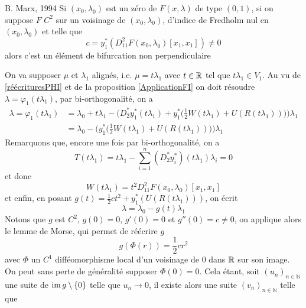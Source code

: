 \documentclass[memoire.tex]{subfiles}
\begin{document}
\begin{theobox}{B. Marx, 1994}{}
    Si $(x_0,\lambda_0)$ est un zéro de $F(x,\lambda)$ de type $(0,1)$, si on suppose $F$ $C^2$ sur un voisinage de $(x_0,\lambda_0)$, d'indice de Fredholm nul en $(x_0,\lambda_0)$ et telle que
    \begin{equation*}
        c=y_1^{*}\left(D^2_{11}F(x_0,\lambda_0)[x_1,x_1]\right)\neq 0
    \end{equation*}
    alors c'est un élément de bifurcation non perpendiculaire
\end{theobox}
\begin{preuve}
    On va supposer $\mu$ et $\lambda_1$ alignés, i.e. $\mu=t\lambda_1$ avec $t\in\mathbb{R}$ tel que $t\lambda_1\in V_1$. Au vu de \eqref{réécrituresPHI} et de la proposition  \ref{ApplicationFI} on doit résoudre $\lambda=\varphi_1(t\lambda_1)$, par bi-orthogonalité, on a
    \begin{align*}
        \lambda
        = \varphi_1(t\lambda_1)&=\lambda_0+t\lambda_1-\bigg(D_2^{*}y_1^{*}(t\lambda_1)+y_1^{*}\big(\frac{1}{2}W(t\lambda_1)+U(R(t\lambda_1))\big)\bigg)\lambda_1\\
        &=\lambda_0-\bigg(y_1^{*}\big(\frac{1}{2}W(t\lambda_1)+U(R(t\lambda_1))\big)\bigg)\lambda_1
    \end{align*}
    Remarquons que, encore une fois par bi-orthogonalité, on a 
    \begin{equation*}
        T(t\lambda_1)=t\lambda_1-\sum_{i=1}^n (D_2^{*}y_i^{*})(t\lambda_1)\lambda_i=0
    \end{equation*}
    et donc 
    \begin{equation*}
        W(t\lambda_1)=t^2D^2_{11}F(x_0,\lambda_0)[x_1,x_1]
    \end{equation*}
    et enfin, en posant $g(t)=\frac{1}{2}ct^2+y_1^{*}(U(R(t\lambda_1)))$, on écrit
    \begin{equation*}
        \lambda=\lambda_0-g(t)\lambda_1
    \end{equation*}
    Notons que $g$ est $C^2$, $g(0)=0$, $g'(0)=0$ et $g''(0)=c\neq 0$, on applique alors le lemme de Morse, qui permet de réécrire $g$
    \begin{equation*}
        g(\Phi(r))=\frac{1}{2}cr^2
    \end{equation*}
    avec $\Phi$ un $C^1$ difféomorphisme local d'un voisinage de $0$ dans $\mathbb{R}$ sur son image. On peut sans perte de généralité supposer $\Phi(0)=0$. Cela 
    étant, soit 
    $(u_n)_{n\in\mathbb{N}}$ une suite de $\operatorname{im} g\setminus \left\{0\right\}$ telle que $u_n\rightarrow 0$, il existe alors une suite $(v_n)_{n\in\mathbb{N}}$ telle que

\end{preuve}
\end{document}
